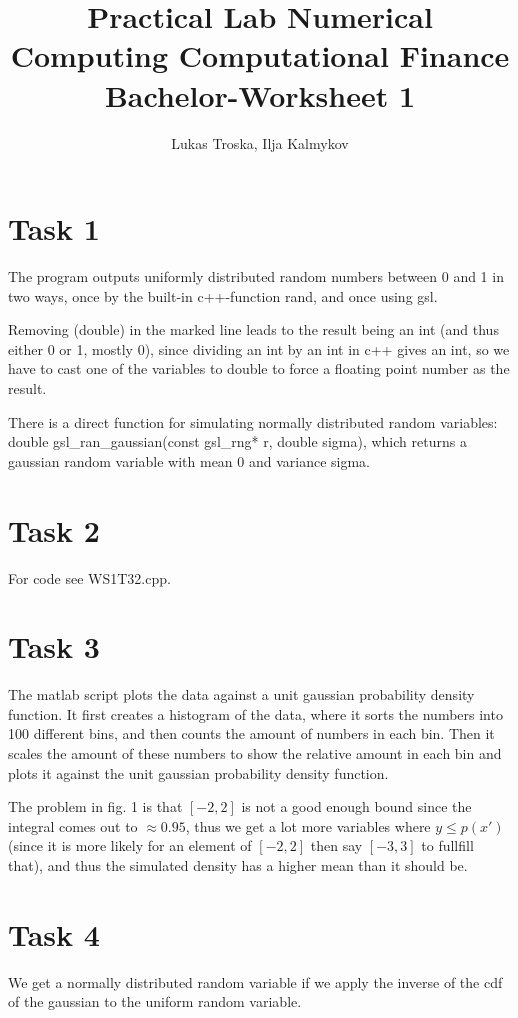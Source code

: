 \documentclass[]{article}
\title{Practical Lab Numerical Computing Computational Finance \\Bachelor-Worksheet 1}
\author{Lukas Troska, Ilja Kalmykov}
\date{}
\begin{document}
\maketitle \section*{Task 1} The program outputs uniformly distributed random
numbers between 0 and 1 in two ways, once by the built-in c++-function rand, and
once using gsl.

Removing (double) in the marked line leads to the result being an int (and thus
either 0 or 1, mostly 0), since dividing an int by an int in c++ gives an int,
so we have to cast one of the variables to double to force a floating point
number as the result.

There is a direct function for simulating normally distributed random variables:
double gsl\_ran\_gaussian(const gsl\_rng* r, double sigma), which returns a
gaussian random variable with mean 0 and variance sigma.

\section*{Task 2}
For code see WS1T32.cpp.

\section*{Task 3} The matlab script plots the data against a unit gaussian
probability density function. It first creates a histogram of the data, where it
sorts the numbers into 100 different bins, and then counts the amount of numbers
in each bin. Then it scales the amount of these numbers to show the relative
amount in each bin and plots it against the unit gaussian probability density
function.

The problem in fig. 1 is that $[-2,2]$ is not a good enough bound since the
integral comes out to $\approx 0.95$, thus we get a lot more variables where
$y\le p(x')$ (since it is more likely for an element of $[-2,2]$ then say
$[-3,3]$ to fullfill that), and thus the simulated density has a higher mean
than it should be.

\section*{Task 4} We get a normally distributed random variable if we apply the
inverse of the cdf of the gaussian to the uniform random variable.
\end{document}
